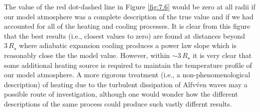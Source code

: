 The value of the red dot-dashed line in Figure \ref{fig:7.6} would be zero at all radii if our model atmosphere was a complete description of the true value and if we had accounted for all of the heating and cooling processes. It is clear from this figure that the best results (i.e., closest values to zero) are found at distances beyond  $3\,R_{\star}$ where adiabatic expansion cooling produces a power law slope which is reasonably close the the model value. However, within $\sim 3\,R_{\star}$ it is very clear that some additional heating source is required to maintain the temperature profile of our model atmosphere. A more rigorous treatment (i.e., a non-phenomenological description) of heating due to the turbulent dissipation of Alfv\'ven waves may a possible route of investigation, although one would wonder how the different descriptions of the same process could produce such vastly differnt results. 